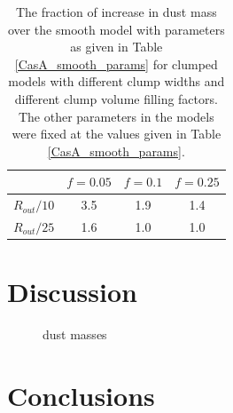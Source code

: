 \begin{table}
\caption{The fraction of increase in dust mass over the smooth model with parameters as given in Table \ref{CasA_smooth_params} for clumped models with different clump widths and different clump volume filling factors.  The other parameters in the models were fixed at the values given in Table \ref{CasA_smooth_params}.}
\centering
\begin{tabular}{l  c c c}
\hline
& $f=0.05$ &$f=0.1$&$f=0.25$\\
\hline
$R_{out}/10$ & 3.5 & 1.9 & 1.4 \\
$R_{out}/25$ & 1.6 & 1.0 & 1.0 \\
\hline
\end{tabular}
\label{CasA_clumped_dust_masses}
\end{table}













\section{Discussion}

\begin{figure}
\centering
{}
\caption{dust masses}
\label{shifted}
\end{figure}


\section{Conclusions}
